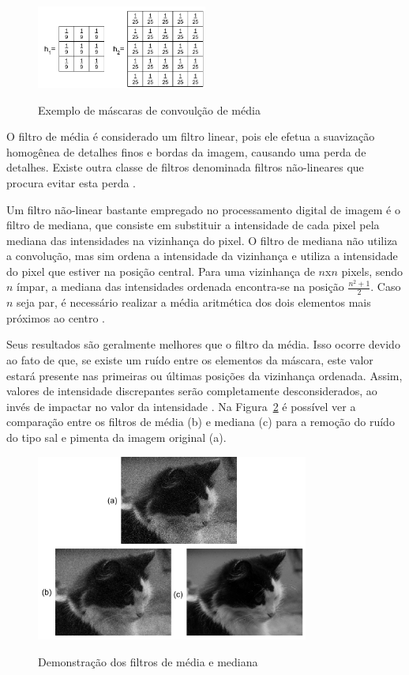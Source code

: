 \documentclass[12pt,oneside,a4paper,english,french,spanish,brazil,]{abntex2}
\begin{document}
\begin{figure}[ht]
\centering
\caption{Exemplo de máscaras de convoulção de média}
\includegraphics[width=0.5\textwidth]{imagens/PDI_Mascara_Media.pdf}
\label{fig:PDI_Mascara_Media}
\end{figure}

O filtro de média é considerado um filtro linear, pois ele efetua a suavização homogênea de detalhes finos e bordas da imagem, causando uma perda de detalhes. Existe outra classe de filtros denominada filtros não-lineares que procura evitar esta perda \cite{pedrini:2008}.

Um filtro não-linear bastante empregado no processamento digital de imagem é o filtro de mediana, que consiste em substituir a intensidade de cada pixel pela mediana das intensidades na vizinhança do pixel. O filtro de mediana não utiliza a convolução, mas sim ordena a intensidade da vizinhança e utiliza a intensidade do pixel que estiver na posição central. Para uma vizinhança de \(n\)x\(n\) pixels, sendo \(n\) ímpar, a mediana das intensidades ordenada encontra-se na posição \(\frac{n^2+1}{2}\). Caso \(n\) seja par, é necessário realizar a média aritmética dos dois elementos mais próximos ao centro \cite{gonzalez:2012}. 

Seus resultados são geralmente melhores que o filtro da média. Isso ocorre devido ao fato de que, se existe um ruído entre os elementos da máscara, este valor estará presente nas primeiras ou últimas posições da vizinhança ordenada. Assim, valores de intensidade discrepantes serão completamente desconsiderados, ao invés de impactar no valor da intensidade \cite{conci:2003}. Na Figura~\ref{fig:PDI_Media_Mediana} é possível ver a comparação entre os filtros de média (b) e mediana (c) para a remoção do ruído do tipo sal e pimenta da imagem original (a).

\begin{figure}[ht]
\centering
\caption{ Demonstração dos filtros de média e mediana}
\includegraphics[width=0.8\textwidth]{imagens/PDI_Media_Mediana.pdf}
\sourceAuthor
\label{fig:PDI_Media_Mediana}
\end{figure}
\end{document}
